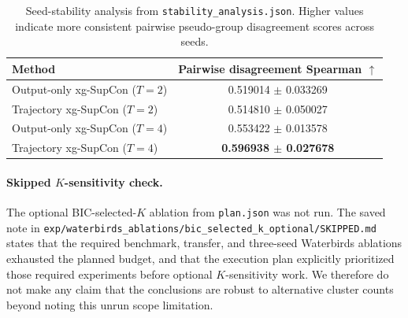 \documentclass{article}
\newcommand{\method}{Trajectory xg-SupCon}
\newcommand{\outputonly}{Output-only xg-SupCon}
\begin{document}
\begin{table}[h]
\caption{Seed-stability analysis from \texttt{stability\_analysis.json}. Higher values indicate more consistent pairwise pseudo-group disagreement scores across seeds.}
\label{tab:appendix-stability}
\centering
\small
\begin{tabular}{lc}
\toprule
Method & Pairwise disagreement Spearman $\uparrow$ \\
\midrule
\outputonly{} ($T{=}2$) & 0.519014 $\pm$ 0.033269 \\
\method{} ($T{=}2$) & 0.514810 $\pm$ 0.050027 \\
\outputonly{} ($T{=}4$) & 0.553422 $\pm$ 0.013578 \\
\method{} ($T{=}4$) & \textbf{0.596938 $\pm$ 0.027678} \\
\bottomrule
\end{tabular}
\end{table}

\paragraph{Skipped \texorpdfstring{$K$}{K}-sensitivity check.}
The optional BIC-selected-$K$ ablation from \texttt{plan.json} was not run. The saved note in \texttt{exp/waterbirds\_ablations/bic\_selected\_k\_optional/SKIPPED.md} states that the required benchmark, transfer, and three-seed Waterbirds ablations exhausted the planned budget, and that the execution plan explicitly prioritized those required experiments before optional $K$-sensitivity work. We therefore do not make any claim that the conclusions are robust to alternative cluster counts beyond noting this unrun scope limitation.
\end{document}
